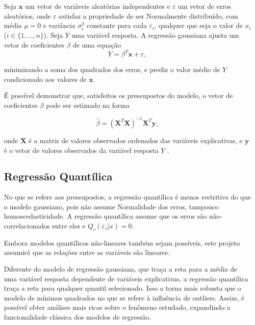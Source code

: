 Seja $\mathbf{x}$ um vetor de variáveis aleatórias independentes e $\varepsilon$ um vetor de erros aleatórios, onde $\varepsilon$ satisfaz a propriedade de ser Normalmente distribuído, com média $\mu = 0$ e variância $\sigma_i ^ 2$ constante para cada $\varepsilon_i$, qualquer que seja o valor de $x_i$ ($i \in \{1, \dots, n\}$). Seja $Y$ uma variável resposta. A regressão gaussiana ajusta um vetor de coeficientes $\beta$ de uma equação
\begin{equation}
Y = \beta ^ {T} \mathbf{x} + \varepsilon,
\end{equation}

\noindent minimizando a soma dos quadrados dos erros, e prediz o valor médio de $Y$ condicionado aos valores de $\mathbf{x}$.

É possível demonstrar que, satisfeitos os pressupostos do modelo, o vetor de coeficientes $\beta$ pode ser estimado na forma

\begin{equation}
\hat{\beta} = (\mathbf{X}^{T}\mathbf{X})^{-1} \mathbf{X}^{T} \mathbf{y},
\end{equation}

\noindent onde $\mathbf{X}$ é a matriz de valores observados ordenados das variáveis explicativas, e $\mathbf{y}$ é o vetor de valores observados da variável resposta $Y$ \cite{montgomerylra}.

\newpage
\subsection{Regressão Quantílica}
No que se refere aos pressupostos, a regressão quantílica é menos restritiva do que o modelo gaussiano, pois não assume Normalidade dos erros, tampouco homoscedasticidade. A regressão quantílica assume que os erros são não-correlacionados entre eles e $Q_\tau(\varepsilon_\tau | x) = 0$.

Embora modelos quantílicos não-lineares também sejam possíveis, este projeto assumirá que as relações entre as variáveis são lineares.

Diferente do modelo de regressão gaussiana, que traça a reta para a média de uma variável resposta dependente de variáveis explicativas, a regressão quantílica traça a reta para qualquer quantil selecionado. Isso a torna mais robusta que o modelo de mínimos quadrados no que se refere à influência de outliers. Assim, é possível obter análises mais ricas sobre o fenômeno estudado, expandindo a funcionalidade clássica dos modelos de regressão.


